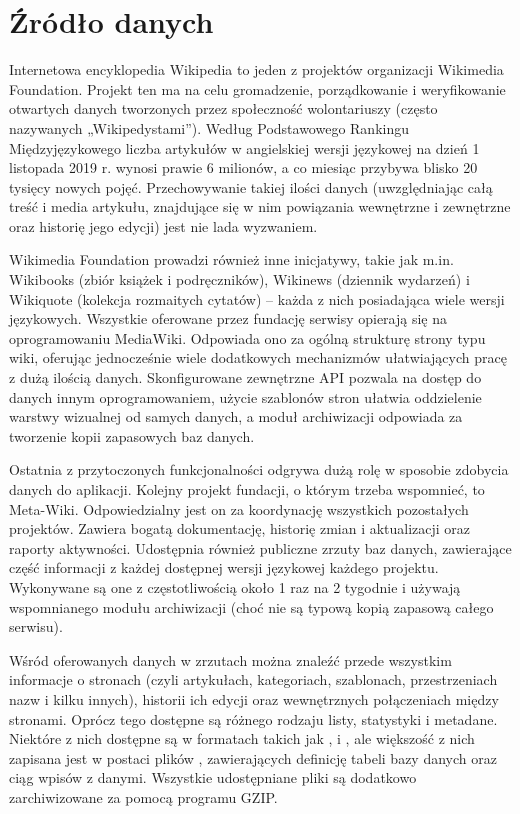 \section{Źródło danych}
\label{sec:data-source}
Internetowa encyklopedia Wikipedia to jeden z projektów organizacji Wikimedia Foundation. Projekt ten ma na celu gromadzenie, porządkowanie i weryfikowanie otwartych danych tworzonych przez społeczność wolontariuszy (często nazywanych „Wikipedystami”). Według Podstawowego Rankingu Międzyjęzykowego \cite{Wiki:PodstawowyRanking} liczba artykułów w angielskiej wersji językowej na dzień 1 listopada 2019 r. wynosi prawie 6 milionów, a co miesiąc przybywa blisko 20 tysięcy nowych pojęć. Przechowywanie takiej ilości danych (uwzględniając całą treść i media artykułu, znajdujące się w nim powiązania wewnętrzne i zewnętrzne oraz historię jego edycji) jest nie lada wyzwaniem.

Wikimedia Foundation prowadzi również inne inicjatywy, takie jak m.in. Wikibooks (zbiór książek i podręczników), Wikinews (dziennik wydarzeń) i Wikiquote (kolekcja rozmaitych cytatów) – każda z nich posiadająca wiele wersji językowych. Wszystkie oferowane przez fundację serwisy opierają się na oprogramowaniu MediaWiki. Odpowiada ono za ogólną strukturę strony typu wiki, oferując jednocześnie wiele dodatkowych mechanizmów ułatwiających pracę z dużą ilością danych. Skonfigurowane zewnętrzne API pozwala na dostęp do danych innym oprogramowaniem, użycie szablonów stron ułatwia oddzielenie warstwy wizualnej od samych danych, a moduł archiwizacji odpowiada za tworzenie kopii zapasowych baz danych.

Ostatnia z przytoczonych funkcjonalności odgrywa dużą rolę w sposobie zdobycia danych do aplikacji. Kolejny projekt fundacji, o którym trzeba wspomnieć, to Meta-Wiki. Odpowiedzialny jest on za koordynację wszystkich pozostałych projektów. Zawiera bogatą dokumentację, historię zmian i aktualizacji oraz raporty aktywności. Udostępnia również publiczne zrzuty baz danych, zawierające część informacji z każdej dostępnej wersji językowej każdego projektu. Wykonywane są one z częstotliwością około 1 raz na 2 tygodnie i używają wspomnianego modułu archiwizacji (choć nie są typową kopią zapasową całego serwisu).

Wśród oferowanych danych w zrzutach można znaleźć przede wszystkim informacje o stronach (czyli artykułach, kategoriach, szablonach, przestrzeniach nazw i kilku innych), historii ich edycji oraz wewnętrznych połączeniach między stronami. Oprócz tego dostępne są różnego rodzaju listy, statystyki i metadane. Niektóre z nich dostępne są w formatach takich jak ,  i , ale większość z nich zapisana jest w postaci plików , zawierających definicję tabeli bazy danych oraz ciąg wpisów z danymi. Wszystkie udostępniane pliki są dodatkowo zarchiwizowane za pomocą programu GZIP.